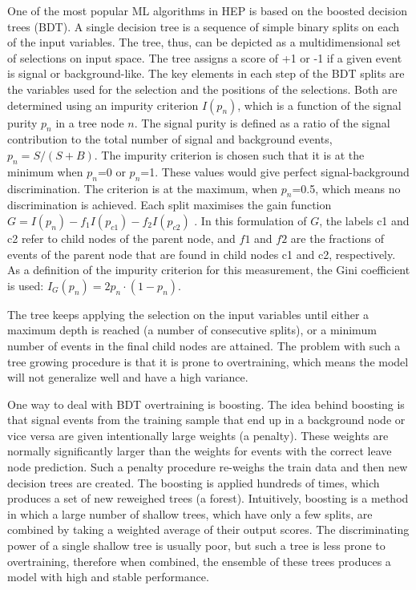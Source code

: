 One of the most popular ML algorithms in HEP is based on the boosted decision trees (BDT). A single decision tree is a sequence of simple binary splits on each of the input variables. The tree, thus, can be depicted as a multidimensional set of selections on input space. The tree assigns a score of +1 or -1 if a given event is signal or background-like. The key elements in each step of the BDT splits are the variables used for the selection and the positions of the selections. Both are determined using an impurity criterion $I(p_n)$, which is a function of the signal purity $p_n$ in a tree node $n$. The signal purity is defined as a ratio of the signal contribution to the total number of signal and background events, $p_n = S/(S+B)$. The impurity criterion is chosen such that it is at the minimum when $p_n$=0 or $p_n$=1. These values would give perfect signal-background discrimination. The criterion is at the maximum, when $p_n$=0.5, which means no discrimination is achieved. 
Each split maximises the gain function $G=I(p_n) - f_1I(p_{c1})-f_2I(p_{c2})$ . In this formulation of $G$, the labels c1 and c2 refer to child nodes of the parent node, and $f1$ and $f2$ are the fractions of events of the parent node that are found in child nodes c1 and c2, respectively. As a definition of the impurity criterion for this measurement, the Gini coefficient is used: $I_G(p_n) = 2 p_n \cdot (1 - p_n)$. 

The tree keeps applying the selection on the input variables until either a maximum depth is reached (a number of consecutive splits), or a minimum number of events in the final child nodes are attained. The problem with such a tree growing procedure is that it is prone to overtraining, which means the model will not generalize well and have a high variance. 

One way to deal with BDT overtraining is boosting. The idea behind boosting is that signal events from the training sample that end up in a background node or vice versa are given intentionally large weights (a penalty). These weights are normally significantly larger than the weights for events with the correct leave node prediction. Such a penalty procedure re-weighs the train data and then new decision trees are created. The boosting is applied hundreds of times, which produces a set of new reweighed trees (a forest). Intuitively, boosting is a method in which a large number of shallow trees, which have only a few splits, are combined by taking a weighted average of their output scores. The discriminating power of a single shallow tree is usually poor, but such a tree is less prone to overtraining, therefore when combined, the ensemble of these trees produces a model with high and stable performance.

